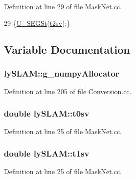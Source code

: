 Definition at line 29 of file Mask\+Net.\+cc.


\begin{DoxyCode}
29 \{\hyperlink{MaskNet_8cc_a8e5d338049896ac5a96c5b617e3e543a}{U\_SEGSt}(\hyperlink{namespacelySLAM_a6b5e057f8ce421fbc6d49a07ef7e3273}{t2sv});\}
\end{DoxyCode}


\subsection{Variable Documentation}
\subsubsection[{\texorpdfstring{g\+\_\+numpy\+Allocator}{g_numpyAllocator}}]{ ly\+S\+L\+A\+M\+::g\+\_\+numpy\+Allocator}\hypertarget{namespacelySLAM_a487059d3e4df5c492791c26d6316a9f2}{}\label{namespacelySLAM_a487059d3e4df5c492791c26d6316a9f2}


Definition at line 205 of file Conversion.\+cc.

\subsubsection[{\texorpdfstring{t0sv}{t0sv}}]{\setlength{\rightskip}{0pt plus 5cm}double ly\+S\+L\+A\+M\+::t0sv}\hypertarget{namespacelySLAM_aee2bcc68912513a06dfc54c894ae3efc}{}\label{namespacelySLAM_aee2bcc68912513a06dfc54c894ae3efc}


Definition at line 25 of file Mask\+Net.\+cc.

\subsubsection[{\texorpdfstring{t1sv}{t1sv}}]{\setlength{\rightskip}{0pt plus 5cm}double ly\+S\+L\+A\+M\+::t1sv}\hypertarget{namespacelySLAM_ab1de636cddc68247bbed233099d643f9}{}\label{namespacelySLAM_ab1de636cddc68247bbed233099d643f9}


Definition at line 25 of file Mask\+Net.\+cc.

